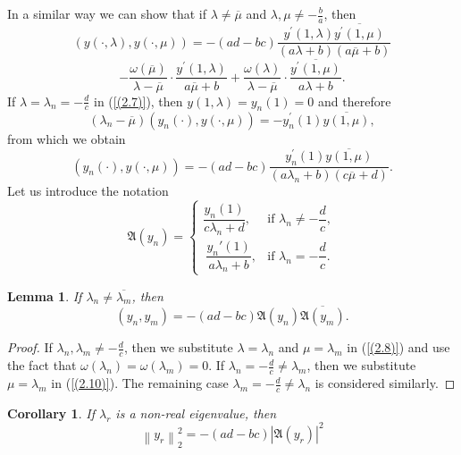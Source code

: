 \documentclass[pdflatex,sn-mathphys-num]{sn-jnl}%
\theoremstyle{thmstyleone}%
\theoremstyle{thmstyletwo}%
\theoremstyle{thmstylethree}%
\newtheorem{cor}[thm]{Corollary}
\newtheorem{lem}[thm]{Lemma}
\theoremstyle{definition}
\theoremstyle{remark}
\numberwithin{equation}{section}
\begin{document}
In a similar way we can show that 
if $\lambda \ne\overline
{\mu}$ and $\lambda,
{\mu}\ne-\frac{b}{a}$, then
\[
\left(y(\cdot,\lambda), y(\cdot,\mu)\right)
= -(ad - bc)\frac{y^\prime(1,\lambda)\overline{y^\prime(1,\mu)}}{(a\lambda + b)(a\overline{\mu} + b)}
\]
\begin{equation}
- \frac{\omega(\overline{\mu})}{\lambda - \overline{\mu}} \cdot \frac{y^\prime(1,\lambda)}{a\overline{\mu} + b}
+ \frac{\omega(\lambda)}{\lambda - \overline{\mu}} \cdot \frac{\overline{y^\prime(1,\mu)}}{a\lambda + b}.\label{(2.9)}
\end{equation}
If  $\lambda=\lambda_n=-\frac{d}{c}$ in (\ref{(2.7)}), then  $y(1,\lambda)=y_n(1)=0$ and therefore  $$
(\lambda_n - \overline
{\mu})\left(y_n(\cdot),y(\cdot,\mu)\right)= -y_n^{\prime
}(1)\overline{y(1,\mu)},
 $$
from which we obtain 
\begin{equation}
\left(y_n(\cdot), y(\cdot,\mu)\right)
= -(ad - bc)\frac{y_n^\prime(1)\overline{y(1,\mu)}}{(a\lambda_n + b)(c\overline{\mu} + d)}. \label{(2.10)}
\end{equation}
Let us introduce the notation 
\begin{equation}
\mathfrak{A}(y_n) =
\begin{cases}
\displaystyle  
\dfrac{y_n(1)}{c\lambda_n + d}, 
& \text{if } \lambda_n \neq -\dfrac{d}{c}, \\[10pt]
\displaystyle \ 
\dfrac{y_n'(1)}{a\lambda_n + b}, 
& \text{if } \lambda_n = -\dfrac{d}{c}.
\end{cases}\label{(2.11)}
\end{equation}
\begin{lem}
If $\lambda _{n}\ne \overline{\lambda _{m}}$, then 
\begin{equation}
\left( y_{n},y_{m} \right) = - (ad-bc)\mathfrak{A}(y_n) \overline{\mathfrak{A}(y_m)} .\label{(2.12)}
\end{equation}
\end{lem}
\begin{proof}
If $\lambda_n,\lambda_m\neq-\frac{d}{c}$, then we substitute  $\lambda=\lambda_n$ and $\mu=\lambda_m$ in (\ref{(2.8)}) and use the fact that $\omega(\lambda_n)=\omega(\lambda_m)=0$.
If \(\lambda_{n}= - \frac{d}{c} \neq \lambda_{m}\), then we substitute $\mu=\lambda_m$ in (\ref{(2.10)}). The remaining case  \(\lambda_{m}= - \frac{d}{c} \neq \lambda_{n}\) is considered similarly.
\end{proof}
\begin{cor}
If $\lambda _{r}$ is a non-real eigenvalue, then
\begin{equation} 
  {\left\| {y_{r} }\right\|}^{2}_{2} = -(ad - bc) {\left| {\mathfrak{A}(y_{r})} \right|^2}\label{(2.13)}
 \end{equation}
\end{cor}
\end{document}
